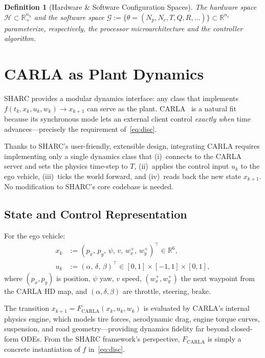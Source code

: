 \documentclass[conference]{IEEEtran}
\newcommand{\R}{\mathbb{R}}
\newcommand{\calH}{\mathcal{H}}
\newcommand{\calG}{\mathcal{G}}
\newtheorem{definition}{Definition}
\begin{document}
\begin{definition}[Hardware \& Software Configuration Spaces]\label{def:spaces}
  The \emph{hardware space}
  $\calH \subset \R_+^{n_h}$ and the \emph{software space}
  $\calG := \{\theta = (N_p, N_c, T, Q, R, \ldots)\}
  \subset \R^{n_s}$ parameterize, respectively, the processor
  microarchitecture and the controller algorithm.
\end{definition}

\section{CARLA as Plant Dynamics}\label{sec:carla}

SHARC provides a modular dynamics interface: any class that implements
$f(t_k, x_k, u_k, w_k) \to x_{k+1}$ can serve as the plant.
CARLA~\cite{dosovitskiy2017carla} is a natural fit because its
synchronous mode lets an external client control \emph{exactly when}
time advances---precisely the requirement of~\eqref{eq:disc}.

Thanks to SHARC's user-friendly, extensible design, integrating CARLA
requires implementing only a single dynamics class that (i)~connects to
the CARLA server and sets the physics time-step to $T$, (ii)~applies
the control input $u_k$ to the ego vehicle, (iii)~ticks the world
forward, and (iv)~reads back the new state $x_{k+1}$.  No modification
to SHARC's core codebase is needed.

\subsection{State and Control Representation}

For the ego vehicle:
\begin{align}
  x_k &:= (p_x,\, p_y,\, \psi,\, v,\, w_x^+,\,
    w_y^+)^\top \in \R^6, \label{eq:state}\\
  u_k &:= (\alpha,\, \delta,\, \beta)^\top \in
    [0, 1] \times [-1, 1] \times [0, 1], \label{eq:control}
\end{align}
where $(p_x, p_y)$ is position, $\psi$ yaw, $v$ speed,
$(w_x^+, w_y^+)$ the next waypoint from the CARLA HD map,
and $(\alpha, \delta, \beta)$ are throttle, steering, brake.

The transition $x_{k+1} = F_{\mathrm{CARLA}}(x_k, u_k, w_k)$ is
evaluated by CARLA's internal physics engine, which models tire
forces, aerodynamic drag, engine torque curves, suspension, and road
geometry---providing dynamics fidelity far beyond closed-form ODEs.
From the SHARC framework's perspective, $F_{\mathrm{CARLA}}$ is simply
a concrete instantiation of $f$ in~\eqref{eq:disc}.
\end{document}
